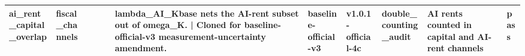 \begin{table}[!htbp]
\begin{tabular}{lllllllllll}
ai\_rent\_capital\_overlap & fiscal\_channels &  &  &  & lambda\_AI\_Kbase nets the AI-rent subset out of omega\_K. | Cloned for baseline-official-v3 measurement-uncertainty amendment. & baseline-official-v3 & v1.0.1-official-4c & double\_counting\_audit & AI rents counted in capital and AI-rent channels & pass \\
\bottomrule
\end{tabular}
\end{table}
